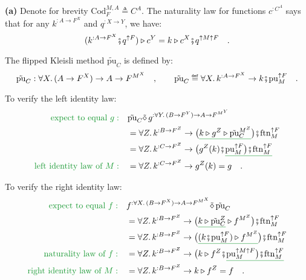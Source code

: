 \textbf{(a)} Denote for brevity $\text{Cod}_{F}^{M,A}\triangleq C^{A}$.
The naturality law for functions $c^{:C^{A}}$ says that for any $k^{:A\rightarrow F^{X}}$
and $q^{:X\rightarrow Y}$, we have:
\[
(k^{:A\rightarrow F^{X}}\bef q^{\uparrow F})\triangleright c^{Y}=k\triangleright c^{X}\bef q^{\uparrow M\uparrow F}\quad.
\]

The flipped Kleisli method $\tilde{\text{pu}}_{C}$ is defined by:
\[
\tilde{\text{pu}}_{C}:\forall X.\,(A\rightarrow F^{X})\rightarrow A\rightarrow F^{M^{X}}\quad,\quad\quad\tilde{\text{pu}}_{C}\triangleq\forall X.\,k^{:A\rightarrow F^{X}}\rightarrow k\bef\text{pu}_{M}^{\uparrow F}\quad.
\]

To verify the left identity law:
\begin{align*}
{\color{greenunder}\text{expect to equal }g:}\quad & \tilde{\text{pu}}_{C}\tilde{\diamond}\,g^{:\forall Y.\,(B\rightarrow F^{Y})\rightarrow A\rightarrow F^{M^{Y}}}\\
 & =\forall Z.\,k^{:B\rightarrow F^{Z}}\rightarrow\big(\gunderline{k\triangleright g^{Z}\triangleright\tilde{\text{pu}}_{C}^{M^{Z}}}\big)\bef\text{ftn}_{M}^{\uparrow F}\\
 & =\forall Z.\,k^{:C\rightarrow F^{Z}}\rightarrow\big(g^{Z}(k)\bef\gunderline{\text{pu}_{M}^{\uparrow F}\big)\bef\text{ftn}_{M}^{\uparrow F}}\\
{\color{greenunder}\text{left identity law of }M:}\quad & =\forall Z.\,k^{:C\rightarrow F^{Z}}\rightarrow g^{Z}(k)=g\quad.
\end{align*}

To verify the right identity law:
\begin{align*}
{\color{greenunder}\text{expect to equal }f:}\quad & f^{:\forall X.\,(B\rightarrow F^{X})\rightarrow A\rightarrow F^{M^{X}}}\tilde{\diamond}\,\tilde{\text{pu}}_{C}\\
 & =\forall Z.\,k^{:B\rightarrow F^{Z}}\rightarrow\big(\gunderline{k\triangleright\tilde{\text{pu}}_{C}^{Z}}\triangleright f^{M^{Z}}\big)\bef\text{ftn}_{M}^{\uparrow F}\\
 & =\forall Z.\,k^{:B\rightarrow F^{Z}}\rightarrow\big(\gunderline{(k\bef\text{pu}_{M}^{\uparrow F})\triangleright f^{M^{Z}}}\big)\bef\text{ftn}_{M}^{\uparrow F}\\
{\color{greenunder}\text{naturality law of }f:}\quad & =\forall Z.\,k^{:B\rightarrow F^{Z}}\rightarrow\big(k\triangleright f^{Z}\bef\gunderline{\text{pu}_{M}^{\uparrow M\uparrow F}\big)\bef\text{ftn}_{M}^{\uparrow F}}\\
{\color{greenunder}\text{right identity law of }M:}\quad & =\forall Z.\,k^{:B\rightarrow F^{Z}}\rightarrow k\triangleright f^{Z}=f\quad.
\end{align*}

